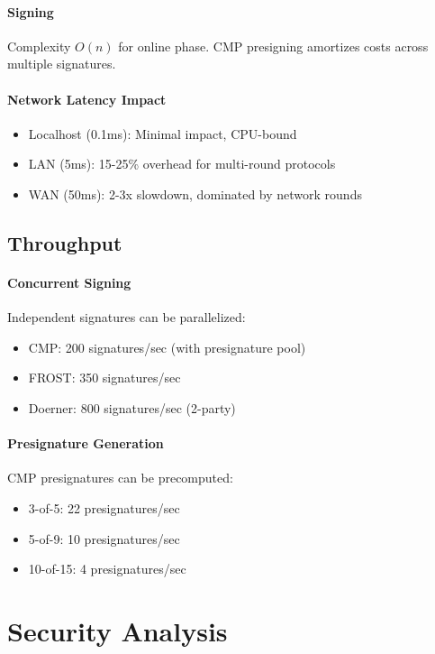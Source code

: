 \documentclass[11pt,twocolumn]{article}
\begin{document}
\paragraph{Signing} Complexity $O(n)$ for online phase. CMP presigning amortizes costs across multiple signatures.

\paragraph{Network Latency Impact}
\begin{itemize}
\item Localhost (0.1ms): Minimal impact, CPU-bound
\item LAN (5ms): 15-25\% overhead for multi-round protocols
\item WAN (50ms): 2-3x slowdown, dominated by network rounds
\end{itemize}

\subsection{Throughput}

\paragraph{Concurrent Signing} Independent signatures can be parallelized:
\begin{itemize}
\item CMP: 200 signatures/sec (with presignature pool)
\item FROST: 350 signatures/sec
\item Doerner: 800 signatures/sec (2-party)
\end{itemize}

\paragraph{Presignature Generation} CMP presignatures can be precomputed:
\begin{itemize}
\item 3-of-5: 22 presignatures/sec
\item 5-of-9: 10 presignatures/sec
\item 10-of-15: 4 presignatures/sec
\end{itemize}

\section{Security Analysis}
\end{document}

